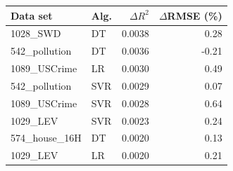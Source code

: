 \begin{tabular}{llrr}
\toprule
\textbf{Data set} & \textbf{Alg.} & \textbf{$\Delta R^2$} & \textbf{$\Delta$RMSE (\%)} \\
\midrule
1028\_SWD & DT & 0.0038 & 0.28 \\
542\_pollution & DT & 0.0036 & -0.21 \\
1089\_USCrime & LR & 0.0030 & 0.49 \\
542\_pollution & SVR & 0.0029 & 0.07 \\
1089\_USCrime & SVR & 0.0028 & 0.64 \\
1029\_LEV & SVR & 0.0023 & 0.24 \\
574\_house\_16H & DT & 0.0020 & 0.13 \\
1029\_LEV & LR & 0.0020 & 0.21 \\
\bottomrule
\end{tabular}
